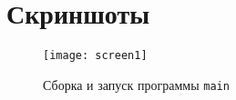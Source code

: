 \section{Скриншоты}

\begin{figure}[H]
  \centering
  \texttt{[image: screen1]}
  \caption{Сборка и запуск программы \texttt{main}}
\end{figure}
